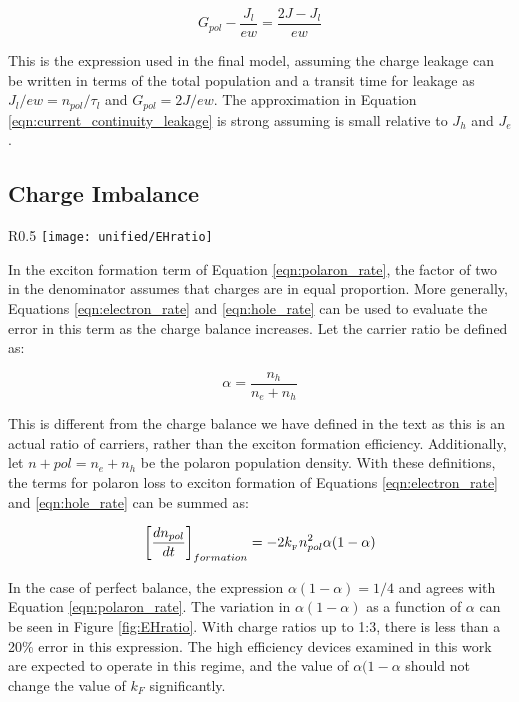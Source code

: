 \documentclass[../thesis.tex]{subfiles}
\begin{document}
\begin{equation}
G_{pol}-\frac{J_l}{ew}=\frac{2J-J_l}{ew}
\label{polaron_generation}
\end{equation}

This is the expression used in the final model, assuming the charge leakage can be written in terms of the total population and a transit time for leakage as  $J_l/ew=n_{pol}/\tau_l$ and $G_{pol}=2J/ew$.  
The approximation in Equation \ref{eqn:current_continuity_leakage} is strong assuming  is small relative to  $J_h$ and $J_e$.

\subsection{Charge Imbalance} \label{sec:charge_imbalance}

\begin{wrapfigure}{R}{0.5\textwidth}
\centering
\texttt{[image: unified/EHratio]}
\caption{The quantity $\alpha(1-\alpha)$ is plotted as a function of the polaron composition, $\alpha$ and the electron to hole ratio.}
\label{fig:EHratio}
\end{wrapfigure}

In the exciton formation term of Equation \ref{eqn:polaron_rate}, the factor of two in the denominator assumes that charges are in equal proportion.  
More generally, Equations \ref{eqn:electron_rate} and \ref{eqn:hole_rate} can be used to evaluate the error in this term as the charge balance increases.  
Let the carrier ratio be defined as:

\begin{equation}
\alpha=\frac{n_h}{n_e+n_h}
\label{eqn:charge_ratio}
\end{equation}

This is different from the charge balance we have defined in the text as this is an actual ratio of carriers, rather than the exciton formation efficiency.  
Additionally, let  $n+{pol}=n_e+n_h$ be the polaron population density.  
With these definitions, the terms for polaron loss to exciton formation of Equations \ref{eqn:electron_rate} and \ref{eqn:hole_rate} can be summed as:

\begin{equation}
\left[\frac{dn_{pol}}{dt}\right]_{formation}=-2k_{_\text{\tiny F}} n_{pol}^2\alpha(1-\alpha)
\label{eqn:exciton_formation_charge_ratio}
\end{equation}

In the case of perfect balance, the expression  $\alpha(1-\alpha)=1/4$ and agrees with Equation \ref{eqn:polaron_rate}.  
The variation in $\alpha(1-\alpha)$ as a function of $\alpha$  can be seen in Figure \ref{fig:EHratio}.  
With charge ratios up to 1:3, there is less than a 20\% error in this expression.  
The high efficiency devices examined in this work are expected to operate in this regime, and the value of  $\alpha(1-\alpha$ should not change the value of  $k_F$ significantly.
\end{document}
